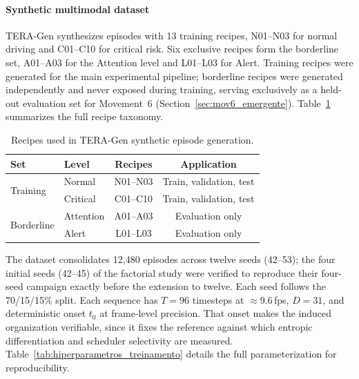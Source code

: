 \documentclass[a4paper,fleqn]{cas-dc}
\newcommand{\TERAGen}{\mbox{TERA-Gen}\xspace}
\begin{document}
\paragraph{Synthetic multimodal dataset}
\TERAGen synthesizes episodes with 13 training recipes, N01--N03 for
normal driving and C01--C10 for critical risk. Six exclusive recipes
form the borderline set, A01--A03 for the Attention level and L01--L03
for Alert. Training recipes were generated for the main experimental
pipeline; borderline recipes were generated independently and never
exposed during training, serving exclusively as a held-out evaluation
set for Movement~6 (Section~\ref{sec:mov6_emergente}).
Table~\ref{tab:receitas} summarizes the full recipe taxonomy.
\begin{table}[!tbp]
\centering
\caption{Recipes used in \mbox{TERA-Gen} synthetic episode generation.}
\label{tab:receitas}
\footnotesize
\setlength{\tabcolsep}{4pt}
\renewcommand{\arraystretch}{1.15}
\begin{tabular}{l l c c}
\toprule
\textbf{Set} & \textbf{Level}
  & \textbf{Recipes} & \textbf{Application} \\
\midrule
\multirow{2}{*}{Training} & Normal   & N01--N03 & Train, validation, test \\
                          & Critical & C01--C10 & Train, validation, test \\
\midrule
\multirow{2}{*}{Borderline} & Attention & A01--A03 & Evaluation only \\
                            & Alert     & L01--L03 & Evaluation only \\
\bottomrule
\end{tabular}
\end{table}
The dataset consolidates {\color{\revcolor}12,480 episodes across twelve seeds
(42--53); the four initial seeds (42--45) of the factorial study were
verified to reproduce their four-seed campaign exactly before the
extension to twelve. Each seed follows} the
70/15/15\% split. Each sequence has $T=96$ timesteps at $\approx$9.6\,fps,
$D=31$, and deterministic onset $t_0$ at frame-level precision. That onset makes
the induced organization verifiable, since it fixes the reference against which
entropic differentiation and scheduler selectivity are measured.
Table~\ref{tab:hiperparametros_treinamento} details the full parameterization
for reproducibility.
\end{document}

